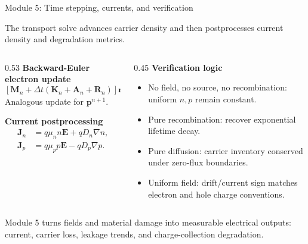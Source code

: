 \documentclass[aspectratio=169,9pt]{beamer}
\newcommand{\grad}{\nabla}
\newcommand{\E}{\bm{E}}
\newcommand{\J}{\bm{J}}
\newcommand{\vect}[1]{\bm{#1}}
\newcommand{\mat}[1]{\mathbf{#1}}
\begin{document}
\begin{frame}{Module 5: Time stepping, currents, and verification}
\footnotesize
\vspace{-3mm}
\begin{bluebox}
\centering
The transport solve advances carrier density and then postprocesses current density and degradation metrics.
\end{bluebox}

\vspace{1mm}
\begin{columns}[T,totalwidth=\textwidth]
\begin{column}{0.53\textwidth}
\textbf{Backward-Euler electron update}
\begin{equation*}
\boxed{\left[\mat{M}_n+\Delta t(\mat{K}_n+\mat{A}_n+\mat{R}_n)\right]\vect{n}^{n+1}
=\mat{M}_n\vect{n}^{n}+\Delta t\vect{g}_n^{n+1}}
\end{equation*}
\small
Analogous update for \(\vect{p}^{n+1}\).

\vspace{1mm}
\textbf{Current postprocessing}
\begin{align*}
\boxed{\J_n}&\boxed{=q\mu_n n\E+qD_n\grad n},\\
\boxed{\J_p}&\boxed{=q\mu_p p\E-qD_p\grad p.}
\end{align*}
\end{column}
\begin{column}{0.45\textwidth}
\textbf{Verification logic}
\begin{itemize}\setlength\itemsep{0.4mm}
\item No field, no source, no recombination: uniform \(n,p\) remain constant.
\item Pure recombination: recover exponential lifetime decay.
\item Pure diffusion: carrier inventory conserved under zero-flux boundaries.
\item Uniform field: drift/current sign matches electron and hole charge conventions.
\end{itemize}
\end{column}
\end{columns}

\vspace{1mm}
\begin{orangebox}
\centering\scriptsize
Module 5 turns fields and material damage into measurable electrical outputs: current, carrier loss, leakage trends, and charge-collection degradation.
\end{orangebox}
\end{frame}
\end{document}
